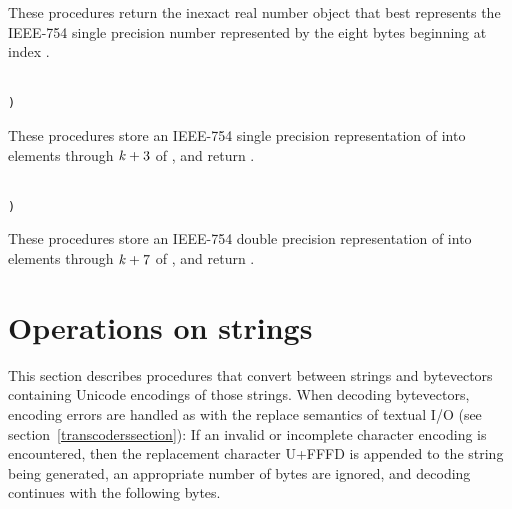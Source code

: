 \begin{entry}{%
}


These procedures return the inexact real number object that best represents the IEEE-754 single
precision number represented by the eight bytes beginning at index
.
\end{entry}

\begin{entry}{%
}
{\tt\obeyspaces\\
       )}


These procedures store an IEEE-754 single precision representation of  into
elements  through $\textnormal{\textit{k}}+3$ of , and return
\unspecifiedreturn.
\end{entry}

\begin{entry}{%
}
{\tt\obeyspaces\\
       )}


These procedures store an IEEE-754 double precision representation of  into
elements  through $\textnormal{\textit{k}}+7$ of , and return
\unspecifiedreturn.
\end{entry}

\section{Operations on strings}

This section describes procedures that convert between strings and
bytevectors containing Unicode encodings of those strings.  When
decoding bytevectors, encoding errors are handled as with the {\cf
  replace} semantics of textual I/O (see
section~\ref{transcoderssection}): If an invalid or incomplete
character encoding is encountered, then the replacement character
U+FFFD is appended to the string being generated, an appropriate
number of bytes are ignored, and decoding continues with the following
bytes.

